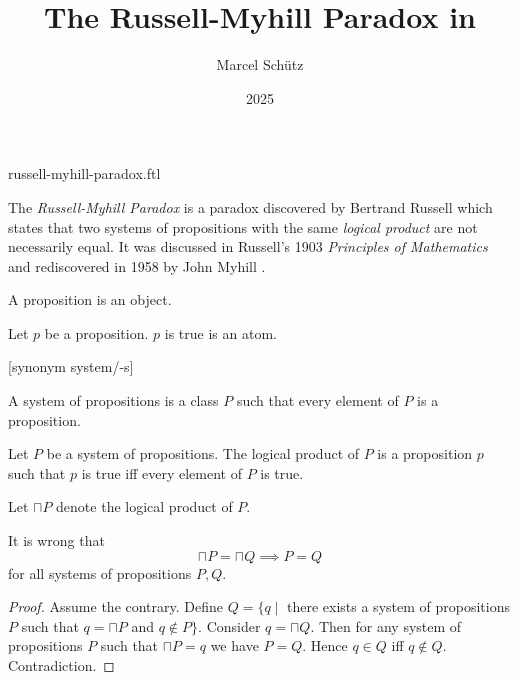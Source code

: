 \documentclass{stex}
\title{The Russell-Myhill Paradox in \Naproche}
\author{Marcel Schütz}
\date{2025}
\begin{document}
\begin{smodule}{russell-myhill-paradox.ftl}
\maketitle

\noindent The \emph{Russell-Myhill Paradox} is a paradox discovered by 
Bertrand Russell which states that two systems of propositions with the same 
\emph{logical product} are not necessarily equal.
It was discussed in Russell's 1903 \emph{Principles of Mathematics}
\cite[Appendix B]{Russell1903} and rediscovered in 1958 by John Myhill
\cite{Myhill1958}.

\begin{forthel}
  \begin{signature*}
    A proposition is an object.
  \end{signature*}

  \begin{signature*}
    Let $p$ be a proposition.
    $p$ is true is an atom.
  \end{signature*}

  [synonym system/-s]

  \begin{definition*}
    A system of propositions is a class $P$ such that every element of $P$ is a proposition.
  \end{definition*}

  \begin{signature*}
    Let $P$ be a system of propositions.
    The logical product of $P$ is a proposition $p$ such that $p$ is true iff every element of $P$ is true.
  \end{signature*}
  
  Let $\sqcap P$ denote the logical product of $P$.
  
  \begin{theorem*}[title=Russell-Myhill Paradox,id=russell_myhill_paradox]
    It is wrong that
    \[ \sqcap P = \sqcap Q \implies P = Q \]
    for all systems of propositions $P, Q$.
  \end{theorem*}
  \begin{proof}
    Assume the contrary.
    Define $Q = \{q \mid$ there exists a system of propositions $P$ such that $q = \sqcap P$ and $q \notin P\}$.
    Consider $q = \sqcap Q$.
    Then for any system of propositions $P$ such that $\sqcap P = q$ we have $P = Q$.
    Hence $q \in Q$ iff $q \notin Q$.
    Contradiction.
  \end{proof}
\end{forthel}

\printbibliography
{}
\end{smodule}
\end{document}
